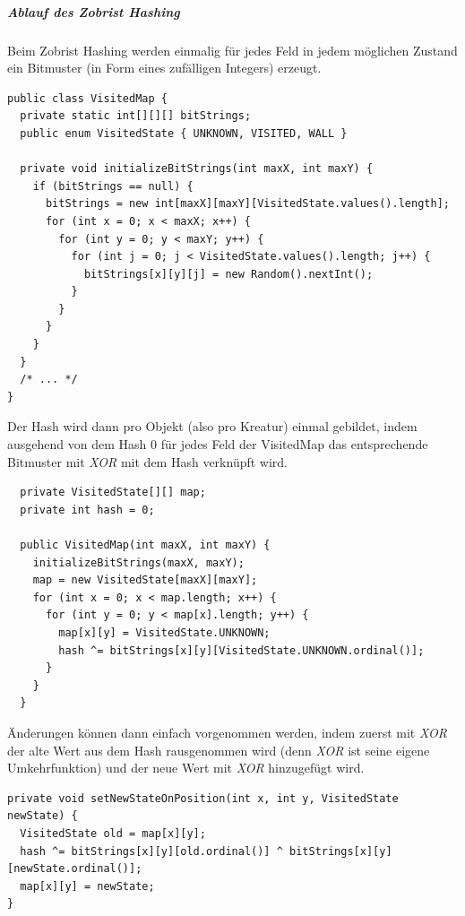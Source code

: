 \subparagraph{Ablauf des Zobrist Hashing} %
 \label{subp:ablauf_des_zobrist_hashing}
 Beim Zobrist Hashing werden einmalig für jedes Feld in jedem möglichen Zustand ein Bitmuster (in Form eines zufälligen Integers) erzeugt.
\begin{lstlisting}
public class VisitedMap {
  private static int[][][] bitStrings;
  public enum VisitedState { UNKNOWN, VISITED, WALL }

  private void initializeBitStrings(int maxX, int maxY) {
    if (bitStrings == null) {
      bitStrings = new int[maxX][maxY][VisitedState.values().length];
      for (int x = 0; x < maxX; x++) {
        for (int y = 0; y < maxY; y++) {
          for (int j = 0; j < VisitedState.values().length; j++) {
            bitStrings[x][y][j] = new Random().nextInt();
          }
        }
      }
    }
  }
  /* ... */
}
\end{lstlisting}
Der Hash wird dann pro  Objekt (also pro Kreatur) einmal gebildet, indem ausgehend von dem Hash 0 für jedes Feld der VisitedMap das entsprechende Bitmuster mit \emph{XOR} mit dem Hash verknüpft wird. 
\begin{lstlisting}
  private VisitedState[][] map;
  private int hash = 0;

  public VisitedMap(int maxX, int maxY) {
    initializeBitStrings(maxX, maxY);
    map = new VisitedState[maxX][maxY];
    for (int x = 0; x < map.length; x++) {
      for (int y = 0; y < map[x].length; y++) {
        map[x][y] = VisitedState.UNKNOWN;
        hash ^= bitStrings[x][y][VisitedState.UNKNOWN.ordinal()];
      }
    }
  }
\end{lstlisting}
Änderungen können dann einfach vorgenommen werden, indem zuerst mit \emph{XOR} der alte Wert aus dem Hash rausgenommen wird (denn \emph{XOR} ist seine eigene Umkehrfunktion) und der neue Wert mit \emph{XOR} hinzugefügt wird.
\begin{lstlisting}
private void setNewStateOnPosition(int x, int y, VisitedState newState) {
  VisitedState old = map[x][y];
  hash ^= bitStrings[x][y][old.ordinal()] ^ bitStrings[x][y][newState.ordinal()];
  map[x][y] = newState;
}
\end{lstlisting}

